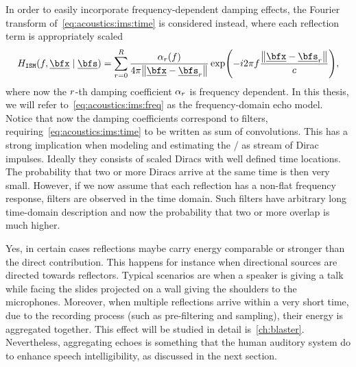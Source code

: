 \mynewline
In order to easily incorporate frequency-dependent damping effects, the Fourier transform of~\cref{eq:acoustics:ims:time} is considered instead, where
each reflection term is appropriately scaled
\begin{equation}\label{eq:acoustics:ims:freq}
    \rirFreq_{\mathtt{ISM}}(f, \positionMicrophone \mid \positionSource) =
        \sum_{\idxEch=0}^{\numEchs} \frac{\absCoeff_{\idxEch}(f)}{4 \pi \norm{\positionMicrophone - \positionSource_\idxEch}}
        \exp\kparen{- \csti 2 \pi f \frac{\norm{\positionMicrophone - \positionSource_\idxEch}}{\speedOfSound}}
        ,
\end{equation}
where now the $r$-th damping coefficient $\alpha_{r}$ is frequency dependent.
In this thesis, we will refer to~\cref{eq:acoustics:ims:freq} as the frequency-domain echo model.
\\Notice that now the damping coefficients correspond to filters, requiring~\cref{eq:acoustics:ims:time} to be written as sum of convolutions.
This has a strong implication when modeling and estimating the \RIRs/ as stream of Dirac impulses.
Ideally they consists of scaled Diracs with well defined time locations.
The probability that two or more Diracs arrive at the same time is then very small.
However, if we now assume that each reflection has a non-flat frequency response, filters are observed in the time domain.
Such filters have arbitrary long time-domain description and now the probability that two or more overlap is much higher.

 Yes, in certain cases reflections maybe carry energy comparable or stronger than the direct contribution.
This happens for instance when directional sources are directed towards reflectors.
Typical scenarios are when a speaker is giving a talk while facing the slides projected on a wall giving the shoulders to the microphones.
Moreover, when multiple reflections arrive within a very short time, due to the recording process (such as pre-filtering and sampling), their energy is aggregated together.
This effect will be studied in detail is~\cref{ch:blaster}.
Nevertheless, aggregating echoes is something that the human auditory system do to enhance speech intelligibility, as discussed in the next section.


